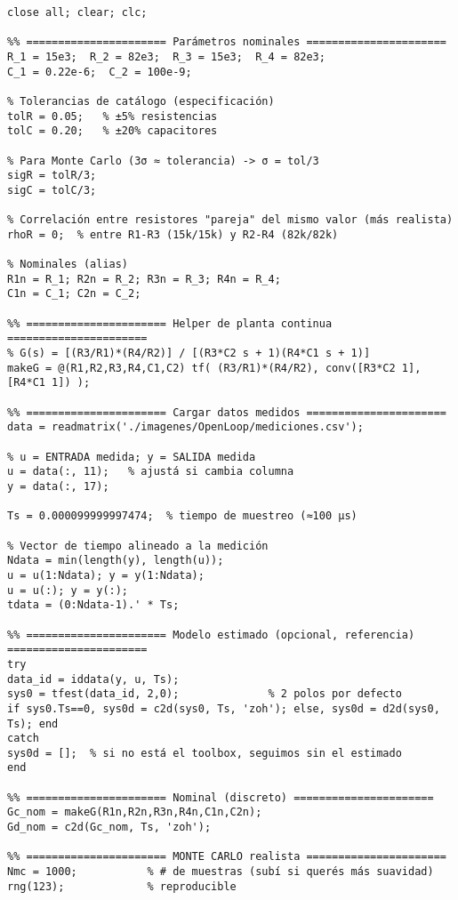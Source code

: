 \begin{lstlisting}[style=matlabstyle,caption={Script para la comparación de la planta en lazo abierto nominal vs mediciones.},label={matlab:openLoop}]
close all; clear; clc;

%% ====================== Parámetros nominales ======================
R_1 = 15e3;  R_2 = 82e3;  R_3 = 15e3;  R_4 = 82e3;
C_1 = 0.22e-6;  C_2 = 100e-9;

% Tolerancias de catálogo (especificación)
tolR = 0.05;   % ±5% resistencias
tolC = 0.20;   % ±20% capacitores

% Para Monte Carlo (3σ ≈ tolerancia) -> σ = tol/3
sigR = tolR/3;
sigC = tolC/3;

% Correlación entre resistores "pareja" del mismo valor (más realista)
rhoR = 0;  % entre R1-R3 (15k/15k) y R2-R4 (82k/82k)

% Nominales (alias)
R1n = R_1; R2n = R_2; R3n = R_3; R4n = R_4;
C1n = C_1; C2n = C_2;

%% ====================== Helper de planta continua ======================
% G(s) = [(R3/R1)*(R4/R2)] / [(R3*C2 s + 1)(R4*C1 s + 1)]
makeG = @(R1,R2,R3,R4,C1,C2) tf( (R3/R1)*(R4/R2), conv([R3*C2 1],[R4*C1 1]) );

%% ====================== Cargar datos medidos ======================
data = readmatrix('./imagenes/OpenLoop/mediciones.csv');

% u = ENTRADA medida; y = SALIDA medida
u = data(:, 11);   % ajustá si cambia columna
y = data(:, 17);

Ts = 0.000099999997474;  % tiempo de muestreo (≈100 µs)

% Vector de tiempo alineado a la medición
Ndata = min(length(y), length(u));
u = u(1:Ndata); y = y(1:Ndata);
u = u(:); y = y(:);
tdata = (0:Ndata-1).' * Ts;

%% ====================== Modelo estimado (opcional, referencia) ======================
try
data_id = iddata(y, u, Ts);
sys0 = tfest(data_id, 2,0);              % 2 polos por defecto
if sys0.Ts==0, sys0d = c2d(sys0, Ts, 'zoh'); else, sys0d = d2d(sys0, Ts); end
catch
sys0d = [];  % si no está el toolbox, seguimos sin el estimado
end

%% ====================== Nominal (discreto) ======================
Gc_nom = makeG(R1n,R2n,R3n,R4n,C1n,C2n);
Gd_nom = c2d(Gc_nom, Ts, 'zoh');

%% ====================== MONTE CARLO realista ======================
Nmc = 1000;           % # de muestras (subí si querés más suavidad)
rng(123);             % reproducible


\end{lstlisting}
